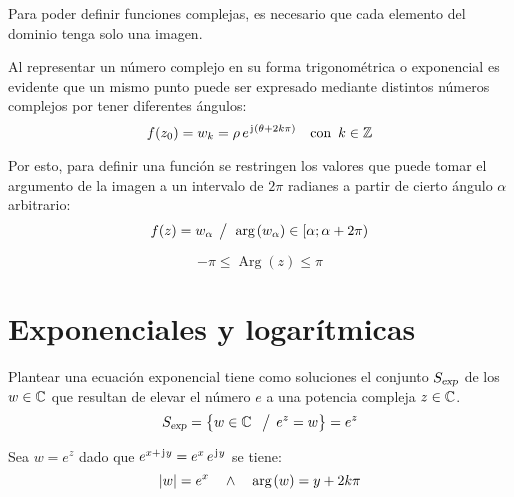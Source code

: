 Para poder definir funciones complejas, es necesario que cada elemento del dominio tenga solo una imagen.

Al representar un número complejo en su forma trigonométrica o exponencial es evidente que un mismo punto puede ser expresado mediante distintos números complejos por tener diferentes ángulos:
\begin{equation*}
    f(z_0) = w_k = \rho \, e^{\mkern2mu\mathrm{j}\mkern1mu \left( \theta + 2 k \pi \right)} \quad \textrm{con} \enspace k \in \mathbb{Z}
\end{equation*}

Por esto, para definir una función se restringen los valores que puede tomar el argumento de la imagen a un intervalo de $2\pi$ radianes a partir de cierto ángulo $\alpha$ arbitrario:
\begin{equation*}
    f(z) = w_\alpha \hspace{1ex} \big/ \hspace{1ex} \mathop{\mathrm{arg}}\mkern2mu(w_\alpha) \in [\alpha;\alpha+2\pi)
\end{equation*}

\begin{mdframed}[style=DefinitionFrame]
    \begin{defn}
    \end{defn}
    \begin{equation*}
        -\pi \leq \operatorname{Arg}(z) \leq \pi
    \end{equation*}
\end{mdframed}


\section{Exponenciales y logarítmicas}

Plantear una ecuación exponencial tiene como soluciones el conjunto ${{S}_\textsl{{exp}}}$ de los $w \in \mathbb{C}$ que resultan de elevar el número $e$ a una potencia compleja $z \in \mathbb{C}$.
\begin{equation*}
    {{S}_\textsl{{exp}}} = { \left\{ {w \in \mathbb{C}\ \hspace{1ex} \big/ \hspace{1ex} e^z = w} \right\} } = e^z
\end{equation*}

\begin{mdframed}[style=PropertyFrame]
    \begin{prop}
    \end{prop}
    Sea $w = e^z$ dado que $e^{x + \mkern2mu\mathrm{j}\mkern1mu y} = e^x \, e^{\mkern2mu\mathrm{j}\mkern1mu y}$ se tiene:
    \begin{equation*}
        {\left| {w} \right|} = e^x \quad \land \quad \mathop{\mathrm{arg}}\mkern2mu(w) = y + 2 k \pi
    \end{equation*}
\end{mdframed}


